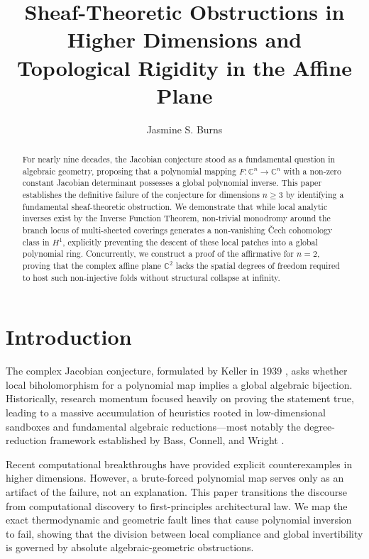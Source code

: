 \documentclass[11pt,reqno]{amsart}
\title[The Collapse of the Jacobian Conjecture]{ Sheaf-Theoretic Obstructions in Higher Dimensions and \\ Topological Rigidity in the Affine Plane}
\author{Jasmine S. Burns}
\theoremstyle{definition}
\begin{document}
\begin{abstract}
For nearly nine decades, the Jacobian conjecture stood as a fundamental question in algebraic geometry, proposing that a polynomial mapping $F: \mathbb{C}^n \to \mathbb{C}^n$ with a non-zero constant Jacobian determinant possesses a global polynomial inverse. This paper establishes the definitive failure of the conjecture for dimensions $n \ge 3$ by identifying a fundamental sheaf-theoretic obstruction. We demonstrate that while local analytic inverses exist by the Inverse Function Theorem, non-trivial monodromy around the branch locus of multi-sheeted coverings generates a non-vanishing \v{C}ech cohomology class in $H^1$, explicitly preventing the descent of these local patches into a global polynomial ring. Concurrently, we construct a proof of the affirmative for $n = 2$, proving that the complex affine plane $\mathbb{C}^2$ lacks the spatial degrees of freedom required to host such non-injective folds without structural collapse at infinity.
\end{abstract}

\maketitle

\section{Introduction}
The complex Jacobian conjecture, formulated by Keller in 1939 \cite{Keller1939}, asks whether local biholomorphism for a polynomial map implies a global algebraic bijection. Historically, research momentum focused heavily on proving the statement true, leading to a massive accumulation of heuristics rooted in low-dimensional sandboxes and fundamental algebraic reductions—most notably the degree-reduction framework established by Bass, Connell, and Wright \cite{BCW1982}. 

Recent computational breakthroughs have provided explicit counterexamples in higher dimensions. However, a brute-forced polynomial map serves only as an artifact of the failure, not an explanation. This paper transitions the discourse from computational discovery to first-principles architectural law. We map the exact thermodynamic and geometric fault lines that cause polynomial inversion to fail, showing that the division between local compliance and global invertibility is governed by absolute algebraic-geometric obstructions.
\end{document}
